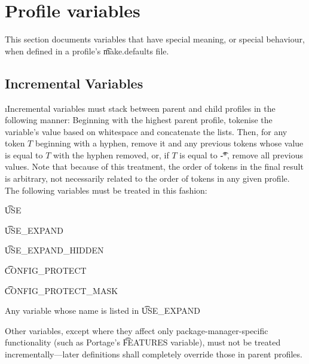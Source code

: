 \section{Profile variables}
\label{profile-variables}

This section documents variables that have special meaning, or special behaviour, when defined in a
profile's \t{make.defaults} file.

\subsection{Incremental Variables}
\i{Incremental} variables must stack between parent and child profiles in the following manner:
Beginning with the highest parent profile, tokenise the variable's value based on whitespace and
concatenate the lists. Then, for any token $T$ beginning with a hyphen, remove it and any previous
tokens whose value is equal to $T$ with the hyphen removed, or, if $T$ is equal to \t{-*}, remove
all previous values. Note that because of this treatment, the order of tokens in the final result is
arbitrary, not necessarily related to the order of tokens in any given profile. The following
variables must be treated in this fashion:
\begin{compactitem}
\item \t{USE}
\item \t{USE\_EXPAND}
\item \t{USE\_EXPAND\_HIDDEN}
\item \t{CONFIG\_PROTECT}
\item \t{CONFIG\_PROTECT\_MASK}
\item Any variable whose name is listed in \t{USE\_EXPAND}
\end{compactitem}

Other variables, except where they affect only package-manager-specific functionality (such as
Portage's \t{FEATURES} variable), must not be treated incrementally---later definitions shall
completely override those in parent profiles.

